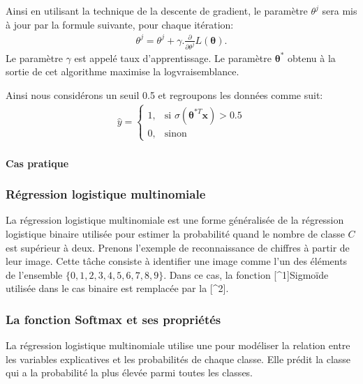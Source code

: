 \documentclass[letterpaper,11pt,english]{sphinxmanual}
\begin{document}
\sphinxAtStartPar
Ainsi en utilisant la technique de la descente de gradient, le paramètre
\(\theta^j\) sera mis à jour par la formule suivante, pour chaque
itération:
\begin{equation}\label{equation:chapter3:chapter3:39}
\begin{split}\theta^j = \theta^j + \gamma . \frac{\partial}{\partial \theta^j}L(\boldsymbol{\theta}).\end{split}
\end{equation}
\sphinxAtStartPar
Le paramètre \(\gamma\) est appelé taux d’apprentissage. Le
paramètre \(\boldsymbol{\theta}^{*}\) obtenu à la sortie de cet
algorithme maximise la log\sphinxhyphen{}vraisemblance.

\sphinxAtStartPar
Ainsi nous considérons un seuil 0.5 et regroupons les données comme
suit:
\begin{equation}\label{equation:chapter3:chapter3:40}
\begin{split}\hat{y}=
\begin{cases}
1,& \text{si } \sigma(\boldsymbol{\theta}^{*T}\mathbf{x}) > 0.5 \\
0,& \text{sinon}
\end{cases}\end{split}
\end{equation}

\paragraph{Cas pratique}
\label{\detokenize{chapter3:cas-pratique}}

\subsubsection{Régression logistique multinomiale}
\label{\detokenize{chapter3:regression-logistique-multinomiale}}
\sphinxAtStartPar
La régression logistique multinomiale est une forme généralisée de la
régression logistique binaire utilisée pour estimer la probabilité quand
le nombre de classe \(C\) est supérieur à deux. Prenons l’exemple de
reconnaissance de chiffres à partir de leur image. Cette tâche consiste
à identifier une image comme l’un des éléments de l’ensemble
\(\{0, 1, 2, 3, 4, 5, 6, 7, 8, 9\}\). Dans ce cas, la fonction
{[}\textasciicircum{}1{]}Sigmoïde utilisée dans le cas binaire est remplacée par la
{[}\textasciicircum{}2{]}.


\subsubsection{La fonction Softmax et ses propriétés}
\label{\detokenize{chapter3:la-fonction-softmax-et-ses-proprietes}}\label{\detokenize{chapter3:estimation-du-maximum-de-vraisemblance-1}}
\sphinxAtStartPar
La régression logistique multinomiale utilise une 
pour modéliser la relation entre les variables explicatives et les
probabilités de chaque classe. Elle prédit la classe qui a la
probabilité la plus élevée parmi toutes les classes.
\end{document}
